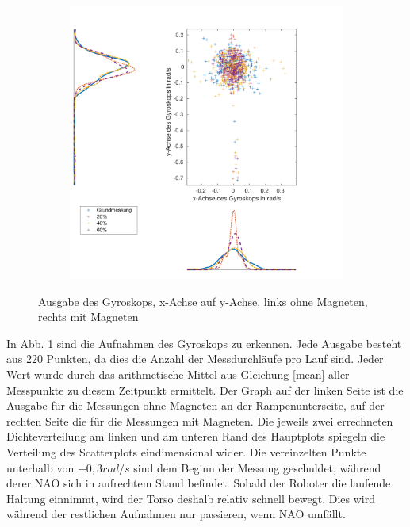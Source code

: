 \begin{figure}[b!]
\begin{adjustwidth}{-0.2\linewidth}{-0.2\linewidth}
\begin{subfigure}[c]{.5\linewidth}
			\centering
			\includegraphics[width=\linewidth]{Bilder/Gyr_Grund_20_40_60_mitM.pdf}
			\vspace{5pt}
		\end{subfigure}
	\end{adjustwidth}
	\caption{Ausgabe des Gyroskops, x-Achse auf y-Achse, links ohne Magneten, rechts mit Magneten}\label{Gyr}
\end{figure}

In Abb. \ref{Gyr} sind die Aufnahmen des Gyroskops zu erkennen. Jede Ausgabe besteht aus 220 Punkten, da dies die Anzahl der Messdurchläufe pro Lauf sind. Jeder Wert wurde durch das arithmetische Mittel aus Gleichung \eqref{mean} aller Messpunkte zu diesem Zeitpunkt ermittelt. Der Graph auf der linken Seite ist die Ausgabe für die Messungen ohne Magneten an der Rampenunterseite, auf der rechten Seite die für die Messungen mit Magneten. Die jeweils zwei errechneten Dichteverteilung am linken und am unteren Rand des Hauptplots spiegeln die Verteilung des Scatterplots eindimensional wider. Die vereinzelten Punkte unterhalb von $-0,3 \unit{rad/s}$ sind dem Beginn der Messung geschuldet, während derer NAO sich in aufrechtem Stand befindet. Sobald der Roboter die laufende Haltung einnimmt, wird der Torso deshalb relativ schnell bewegt. Dies wird während der restlichen Aufnahmen nur passieren, wenn NAO umfällt. 

